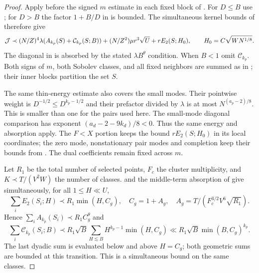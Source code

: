 \begin{proof}
Apply \cite[Lemma~\ref*{p-lem:thincompatibility}]{Thin} before the signed $m$ estimate
in each fixed block of \cite[Proposition~\ref*{six-prop:dualityproof}]{Weighted}.
For $D\le B$ use \cite[(\ref*{p-eq:pairprofile})]{Thin}; for $D>B$ the factor $1+B/D$
in \cite[Proposition~\ref*{six-prop:allenergy}]{Weighted} is bounded.
The simultaneous kernel bounds of \cite[Corollary~\ref*{six-cor:two}]{Weighted} therefore give
\[
 \mathcal{J}\prec (N/Z)^4\lambda(A_{k_p}(S)+\mathcal C_{k_p}(S;B))
       +(N/Z^2)\mu r^3\sqrt U+rE_2(S;H_0),
 \qquad H_0=C\sqrt{WN^{1/8}}.
\]
The diagonal in \cite[(\ref*{p-eq:pairprofile})]{Thin} is absorbed by the stated
$\lambda B^\theta$ condition. When $B<1$ omit $\mathcal C_{k_p}$.
Both signs of $m$, both Sobolev classes, and all fixed neighbors
are summed as in \cite[Corollary~\ref*{six-cor:blockconsumer}]{Weighted}; their inner
blocks partition the set $S$.

The same thin-energy estimate also covers the small modes.
Their pointwise weight is $D^{-1/2}\le D^{k_p-1/2}$ and their
prefactor divided by $\lambda$ is at most $N^{(a_p-2)/8}$.
This is smaller than one for the pairs used here.
The small-mode diagonal comparison has exponent
$(a_d-2-9k_d)/8<0$. Thus the same energy and absorption apply.
The $F<X$ portion keeps the bound $rE_2(S;H_0)$ in its
local coordinates; the zero mode, nonstationary pair modes and
completion keep their bounds from \cite{Weighted}. The dual coefficients
remain fixed across $m$.

Let $R_1$ be the total number of selected points, $F_c$ the
cluster multiplicity, and $K\prec T/(V^2W)$ the number of classes.
\cite[Proposition~\ref*{six-prop:pairproof}]{Weighted} and the middle-term absorption of
\cite[Lemma~\ref*{six-lem:weighted}]{Weighted}
give simultaneously, for all $1\le H\ll U$,
\[
 \sum_iE_2(S_i;H)\prec R_1\min(H,C_g),\quad
 C_g=1+A_g,\quad A_g=T/(F_c^{3/2}V^6\sqrt{R_1}).
\]
Hence $\sum_iA_{k_p}(S_i)\prec R_1C_g^\theta$ and
\[
 \sum_i\mathcal C_{k_p}(S_i;B)
 \prec R_1\sqrt B\sum_{H\lesssim B}H^{k_p-1}\min(H,C_g)
 \ll R_1\sqrt B\min(B,C_g)^{k_p}.
\]
The last dyadic sum is evaluated below and above $H=C_g$; both
geometric sums are bounded at this transition. This is a simultaneous
bound on the same classes.


\end{proof}
